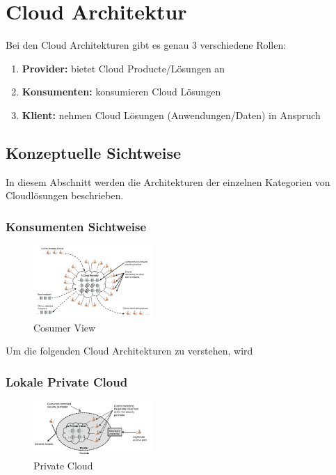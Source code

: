 \pagebreak
\section{Cloud Architektur}

Bei den Cloud Architekturen gibt es genau 3 verschiedene Rollen:
\begin{enumerate}
	\item \textbf{Provider:} bietet Cloud Producte/Lösungen an
	\item \textbf{Konsumenten:} konsumieren Cloud Lösungen
	\item \textbf{Klient:} nehmen Cloud Lösungen (Anwendungen/Daten) in Anspruch
\end{enumerate}

\subsection{Konzeptuelle Sichtweise}

In diesem Abschnitt werden die Architekturen der einzelnen Kategorien von Cloudlösungen beschrieben.

\subsubsection{Konsumenten Sichtweise}

\begin{figure}[H]
    \centering
	\includegraphics[width=0.4\textwidth]{Images/ConsumerView}
	\caption{Cosumer View \cite{Badger}}
	\label{ConsumerView}
\end{figure}

Um die folgenden Cloud Architekturen zu verstehen, wird 


\subsubsection{Lokale Private Cloud}
\begin{figure}[H]
    \centering
	\includegraphics[width=0.4\textwidth]{Images/On-sitePrivateCloud}
	\caption{Private Cloud \cite{Badger}}
	\label{PrivateCloud}
\end{figure}


